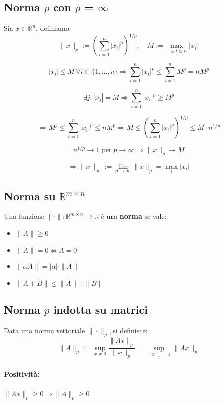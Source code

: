 \documentclass[12pt,a4paper]{article}
\begin{document}
\subsection*{Norma $p$ con $p$ = $\infty$}

Sia $x \in \mathbb{R}^n$, definiamo:
\[
\|x\|_p := \left( \sum_{i=1}^n |x_i|^p \right)^{1/p}, \quad M := \max_{1 \le i \le n} |x_i|
\]

\[
|x_i| \le M\ \forall i \in \{1,\dots,n\}\Rightarrow \sum_{i=1}^n |x_i|^p \le \sum_{i=1}^n M^p = n M^p
\]

\[
\exists j : |x_j| = M \Rightarrow \sum_{i=1}^n |x_i|^p \ge M^p
\]

\[
\Rightarrow M^p \le \sum_{i=1}^n |x_i|^p \le n M^p
\Rightarrow M \le \left( \sum_{i=1}^n |x_i|^p \right)^{1/p} \le M \cdot n^{1/p}
\]

\[
n^{1/p} \to 1 \text{ per } p \to \infty \Rightarrow \|x\|_p \to M
\]

\[
\Rightarrow \|x\|_\infty := \lim_{p \to \infty} \|x\|_p = \max_i |x_i|
\]


\newpage
\subsection*{Norma su $\mathbb{R}^{m \times n}$}

Una funzione $\|\cdot\| : \mathbb{R}^{m \times n} \to \mathbb{R}$ è una \textbf{norma} se vale:

\begin{itemize}
  \item $\|A\| \ge 0$
  \item $\|A\| = 0 \Leftrightarrow A = 0$
  \item $\|\alpha A\| = |\alpha| \cdot \|A\|$
  \item $\|A + B\| \le \|A\| + \|B\|$
\end{itemize}

\subsection*{Norma $p$ indotta su matrici}

Data una norma vettoriale $\|\cdot\|_p$, si definisce:
\[
\|A\|_p := \sup_{x \ne 0} \frac{\|Ax\|_p}{\|x\|_p} = \sup_{\|x\|_p = 1} \|Ax\|_p
\]

\paragraph{Positività:} $\|Ax\|_p \ge 0 \Rightarrow \|A\|_p \ge 0$
\end{document}
